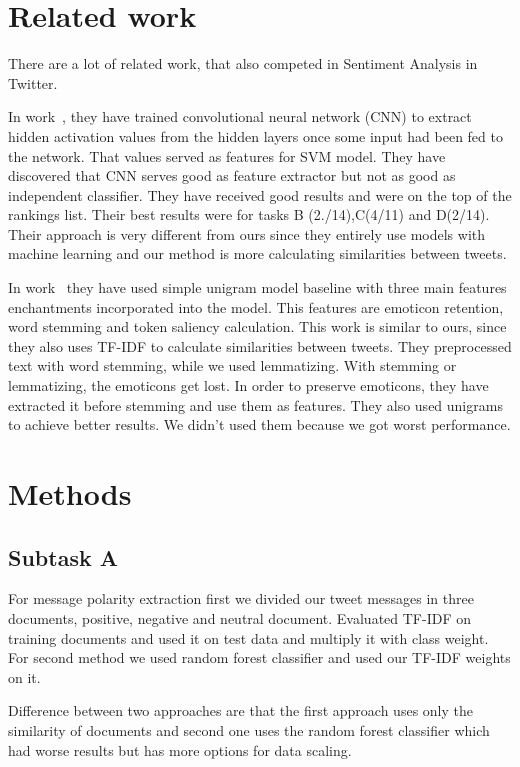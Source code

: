 \documentclass[runningheads,a4paper]{llncs}
\begin{document}
\section{Related work}
There are a lot of related work, that also competed in Sentiment Analysis in Twitter.

 In work~\cite{vilaresa2016lys}, they have trained convolutional neural network (CNN) to extract hidden activation values from the hidden layers once some input had been fed to the network. That values served as features for SVM model. They have discovered that CNN serves good as feature extractor but not as good as independent classifier. They have received good results and were on the top of the rankings list. Their best results were for tasks B (2./14),C(4/11) and D(2/14). Their approach is very different from ours since they entirely use models with machine learning and our method is more calculating similarities between tweets. 

In work~\cite{briones2016vcu} they have used simple unigram model baseline with three main features enchantments incorporated into the model. This features are emoticon retention, word stemming and token saliency calculation. This work is similar to ours, since they also uses TF-IDF to calculate similarities between tweets. They preprocessed text with word stemming, while we used lemmatizing. With stemming or lemmatizing, the emoticons get lost. In order to preserve emoticons, they have extracted it before stemming and use them as features. They also used unigrams to achieve better results. We didn't used them because we got worst performance.


\section{Methods}

\subsection{Subtask A}

For message polarity extraction first we divided our tweet messages in three documents, positive, negative and neutral document. Evaluated TF-IDF on training documents and used it on test data and multiply it with class weight. For second method we used random forest classifier and used our TF-IDF weights on it.

Difference between two approaches are that the first approach uses only the similarity of documents and second one uses the random forest classifier which had worse results but has more options for data scaling.
\end{document}
